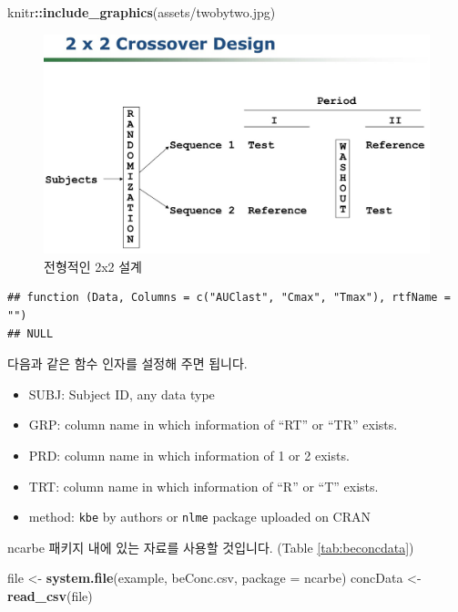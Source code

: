 \documentclass[
  12pt,
]{krantz}
\newenvironment{Shaded}{\begin{snugshade}}{\end{snugshade}}
\newcommand{\DataTypeTok}[1]{\textcolor[rgb]{0.13,0.29,0.53}{#1}}
\newcommand{\KeywordTok}[1]{\textcolor[rgb]{0.13,0.29,0.53}{\textbf{#1}}}
\newcommand{\NormalTok}[1]{#1}
\newcommand{\OperatorTok}[1]{\textcolor[rgb]{0.81,0.36,0.00}{\textbf{#1}}}
\newcommand{\StringTok}[1]{\textcolor[rgb]{0.31,0.60,0.02}{#1}}
\providecommand{\tightlist}{%
  \setlength{\itemsep}{0pt}\setlength{\parskip}{0pt}}
\begin{document}
\begin{Shaded}
\begin{Highlighting}[]
\NormalTok{knitr}\OperatorTok{::}\KeywordTok{include\_graphics}\NormalTok{(}\StringTok{\textquotesingle{}assets/twobytwo.jpg\textquotesingle{}}\NormalTok{)}
\end{Highlighting}
\end{Shaded}

\begin{figure}
\includegraphics[width=1\linewidth]{assets/twobytwo} \caption{전형적인 2x2 설계}\label{fig:twobytwo}
\end{figure}

\begin{verbatim}
## function (Data, Columns = c("AUClast", "Cmax", "Tmax"), rtfName = "") 
## NULL
\end{verbatim}

다음과 같은 함수 인자를 설정해 주면 됩니다.

\begin{itemize}
\tightlist
\item
  SUBJ: Subject ID, any data type
\item
  GRP: column name in which information of ``RT'' or ``TR'' exists.
\item
  PRD: column name in which information of 1 or 2 exists.
\item
  TRT: column name in which information of ``R'' or ``T'' exists.
\item
  method: \texttt{kbe} by authors or \texttt{nlme} package uploaded on CRAN
\end{itemize}

ncarbe 패키지 내에 있는 자료를 사용할 것입니다. (Table \ref{tab:beconcdata})

\begin{Shaded}
\begin{Highlighting}[]
\NormalTok{file \textless{}{-}}\StringTok{ }\KeywordTok{system.file}\NormalTok{(}\StringTok{\textquotesingle{}example\textquotesingle{}}\NormalTok{, }\StringTok{\textquotesingle{}beConc.csv\textquotesingle{}}\NormalTok{, }\DataTypeTok{package =} \StringTok{\textquotesingle{}ncarbe\textquotesingle{}}\NormalTok{)}
\NormalTok{concData \textless{}{-}}\StringTok{ }\KeywordTok{read\_csv}\NormalTok{(file)}
\end{Highlighting}
\end{Shaded}
\end{document}
